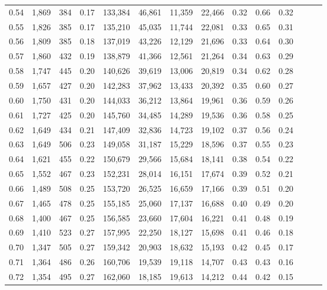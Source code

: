 \begin{tabular}{rrrrrrrrrrrrrr}
0.54 &  1,869 &  384 &  0.17 &  133,384 &   46,861 &  11,359 &  22,466 &  0.32 &  0.66 &      0.32 \\
0.55 &  1,826 &  385 &  0.17 &  135,210 &   45,035 &  11,744 &  22,081 &  0.33 &  0.65 &      0.31 \\
0.56 &  1,809 &  385 &  0.18 &  137,019 &   43,226 &  12,129 &  21,696 &  0.33 &  0.64 &      0.30 \\
0.57 &  1,860 &  432 &  0.19 &  138,879 &   41,366 &  12,561 &  21,264 &  0.34 &  0.63 &      0.29 \\
0.58 &  1,747 &  445 &  0.20 &  140,626 &   39,619 &  13,006 &  20,819 &  0.34 &  0.62 &      0.28 \\
0.59 &  1,657 &  427 &  0.20 &  142,283 &   37,962 &  13,433 &  20,392 &  0.35 &  0.60 &      0.27 \\
0.60 &  1,750 &  431 &  0.20 &  144,033 &   36,212 &  13,864 &  19,961 &  0.36 &  0.59 &      0.26 \\
0.61 &  1,727 &  425 &  0.20 &  145,760 &   34,485 &  14,289 &  19,536 &  0.36 &  0.58 &      0.25 \\
0.62 &  1,649 &  434 &  0.21 &  147,409 &   32,836 &  14,723 &  19,102 &  0.37 &  0.56 &      0.24 \\
0.63 &  1,649 &  506 &  0.23 &  149,058 &   31,187 &  15,229 &  18,596 &  0.37 &  0.55 &      0.23 \\
0.64 &  1,621 &  455 &  0.22 &  150,679 &   29,566 &  15,684 &  18,141 &  0.38 &  0.54 &      0.22 \\
0.65 &  1,552 &  467 &  0.23 &  152,231 &   28,014 &  16,151 &  17,674 &  0.39 &  0.52 &      0.21 \\
0.66 &  1,489 &  508 &  0.25 &  153,720 &   26,525 &  16,659 &  17,166 &  0.39 &  0.51 &      0.20 \\
0.67 &  1,465 &  478 &  0.25 &  155,185 &   25,060 &  17,137 &  16,688 &  0.40 &  0.49 &      0.20 \\
0.68 &  1,400 &  467 &  0.25 &  156,585 &   23,660 &  17,604 &  16,221 &  0.41 &  0.48 &      0.19 \\
0.69 &  1,410 &  523 &  0.27 &  157,995 &   22,250 &  18,127 &  15,698 &  0.41 &  0.46 &      0.18 \\
0.70 &  1,347 &  505 &  0.27 &  159,342 &   20,903 &  18,632 &  15,193 &  0.42 &  0.45 &      0.17 \\
0.71 &  1,364 &  486 &  0.26 &  160,706 &   19,539 &  19,118 &  14,707 &  0.43 &  0.43 &      0.16 \\
0.72 &  1,354 &  495 &  0.27 &  162,060 &   18,185 &  19,613 &  14,212 &  0.44 &  0.42 &      0.15 \\

\end{tabular}
